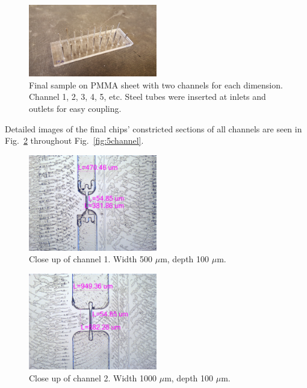 \documentclass[journal, a4paper]{IEEEtran}
\begin{document}
\begin{figure}
	\begin{center}
\includegraphics[width=0.5\textwidth]{images/finalchip.png}
		\caption{\label{fig:chip} Final sample on PMMA sheet with two channels for each dimension. Channel 1, 2, 3, 4, 5, etc. Steel tubes were inserted at inlets and outlets for easy coupling.}
        	\end{center}
\end{figure}
 
Detailed images of the final chips' constricted sections of all channels are seen in Fig.~\ref{fig:1channel} throughout Fig.~\ref{fig:5channel}.

\begin{figure}
\begin{center}
\includegraphics[width=0.5\textwidth]{images/w500d100Dim.jpg}
		\caption{\label{fig:1channel} Close up of channel 1. Width 500 $\mu$m, depth 100 $\mu$m.}
        \end{center}
\end{figure}

\begin{figure}
\begin{center}
\includegraphics[width=0.5\textwidth]{images/w1000d100Dim.jpg}
		\caption{\label{fig:2channel} Close up of channel 2. Width 1000 $\mu$m, depth 100 $\mu$m.}
        \end{center}
\end{figure}
    
\end{document}
